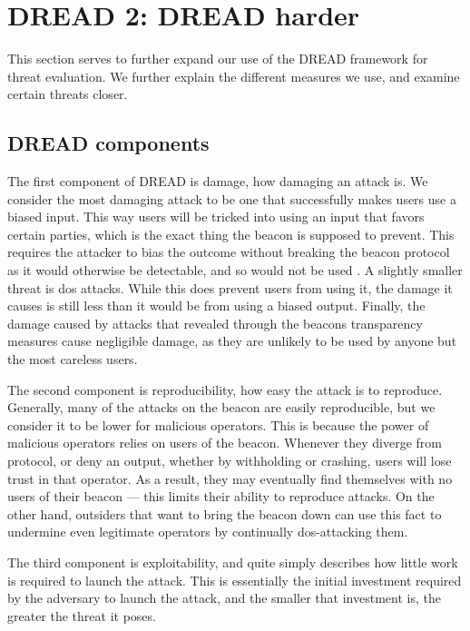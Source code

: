 \section{DREAD 2: DREAD harder}\label{app:dread}
This section serves to further expand our use of the DREAD framework for threat evaluation. We further explain the different measures we use, and examine certain threats closer.

\subsection{DREAD components}
The first component of DREAD is damage, how damaging an attack is. We consider the most damaging attack to be one that successfully makes users use a biased input. This way users will be tricked into using an input that favors certain parties, which is the exact thing the beacon is supposed to prevent. This requires the attacker to bias the outcome without breaking the beacon protocol as it would otherwise be detectable, and so would not be used .
A slightly smaller threat is \acrshort{dos} attacks. While this does prevent users from using it, the damage it causes is still less than it would be from using a biased output.
Finally, the damage caused by attacks that revealed through the beacons transparency measures cause negligible damage, as they are unlikely to be used by anyone but the most careless users.

The second component is reproducibility, how easy the attack is to reproduce. Generally, many of the attacks on the beacon are easily reproducible, but we consider it to be lower for malicious operators. This is because the power of malicious operators relies on users of the beacon. Whenever they diverge from protocol, or deny an output, whether by withholding or crashing, users will lose trust in that operator. As a result, they may eventually find themselves with no users of their beacon --- this limits their ability to reproduce attacks.
On the other hand, outsiders that want to bring the beacon down can use this fact to undermine even legitimate operators by continually \acrshort{dos}-attacking them.

The third component is exploitability, and quite simply describes how little work is required to launch the attack. This is essentially the initial investment required by the adversary to launch the attack, and the smaller that investment is, the greater the threat it poses.


